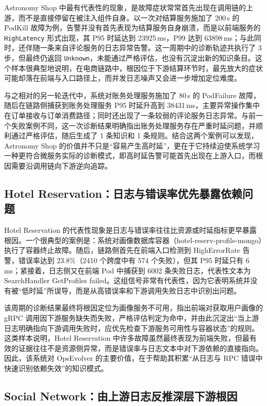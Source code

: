 Astronomy Shop 中最有代表性的现象，是故障症状常常首先出现在调用链的上游，而不是直接停留在被注入组件自身。以一次对结算服务施加了 200\,s 的 PodKill 故障为例，告警并没有首先表现为结算服务自身崩溃，而是以前端服务的 \texttt{HighLatency} 形式出现，其 P95 时延达到 23925\,ms，P99 达到 63898\,ms；与此同时，还伴随一条来自评论服务的日志异常告警。这一周期中的诊断轨迹共执行了 3 步，但最终仍返回 \texttt{Unknown}，未能通过严格评估，也没有沉淀出新的知识条目。这个样本很典型地说明，在电商链路中，根因位于下游结算环节时，最先放大的症状可能却落在前端与入口路径上，而并发日志噪声又会进一步增加定位难度。

与之相对的另一轮迭代中，系统对账务处理服务施加了 80\,s 的 PodFailure 故障，随后在链路侧捕获到账务处理服务 P95 时延升高到 38431\,ms，主要异常操作集中在订单接收与订单消费路径；同时还出现了一条较弱的评论服务日志异常。与前一个失败案例不同，这一次诊断结果明确指出账务处理服务存在严重时延问题，并顺利通过严格评估，随后生成了 1 条知识和 1 条规则。结合这两个案例可以发现，Astronomy Shop 的价值并不只是“容易产生高时延”，更在于它持续迫使系统学习一种更符合微服务实际的诊断模式，即高时延告警可能首先出现在上游入口，而根因需要沿调用链向下游逆向追踪。

\subsection{Hotel Reservation：日志与错误率优先暴露依赖问题}

Hotel Reservation 的代表性现象是日志与错误率往往比资源或时延指标更早暴露根因。一个很典型的案例是：系统对画像数据库容器（hotel-reserv-profile-mongo）执行了容器终止故障。随后，链路侧首先在前端入口检测到 HighErrorRate 告警，错误率达到 23.8\%（2410 个跨度中有 574 个失败），但其 P95 时延只有 6\,ms；紧接着，日志侧又在前端 Pod 中捕获到 6002 条失败日志，代表性文本为 SearchHandler GetProfiles failed。这组信号非常有代表性，因为它表明系统并没有被“低时延”所误导，而是从高错误率和下游调用失败日志中识别出问题。

该周期的诊断结果最终将根因定位为画像服务不可用，指出前端对获取用户画像的 gRPC 调用因下游服务缺失而失败，严格评估判定为命中，并由此沉淀出“当上游日志明确指向下游调用失败时，应优先检查下游服务可用性与容器状态”的规则。这类样本说明，Hotel Reservation 中许多故障虽然最终表现为前端失败，但最有效的证据往往不是资源侧异常，而是错误率与日志文本中对下游依赖的直接指向。因此，该系统对 OpsEvolver 的主要价值，在于帮助其积累“从日志与 RPC 错误中快速识别依赖失效”的知识模式。

\subsection{Social Network：由上游日志反推深层下游根因}

